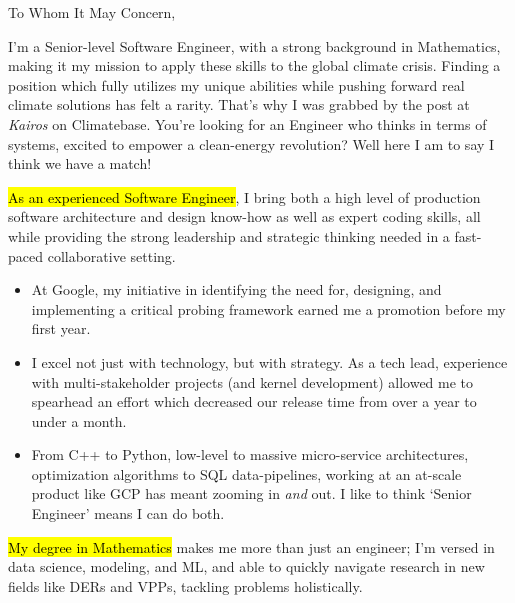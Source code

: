 \documentclass{tc_cv}
\begin{document}

\begin{adjustwidth}{40pt}{40pt}
  \large

  To Whom It May Concern, \par \bigbreak

  I'm a Senior-level Software Engineer, with a strong background in
  Mathematics, making it my mission to apply these skills to the global climate
  crisis. Finding a position which fully utilizes my unique abilities while
  pushing forward real climate solutions has felt a rarity. That's why I was
  grabbed by the post at \emph{Kairos} on Climatebase. You're looking for an
  Engineer who thinks in terms of systems, excited to empower a clean-energy
  revolution? Well here I am to say I think we have a match! \medbreak

  \hl{As an experienced Software Engineer}, I bring both a high level of
  production software architecture and design know-how as well as expert coding
  skills, all while providing the strong leadership and strategic thinking
  needed in a fast-paced collaborative setting.
  \begin{itemize}

    \item At Google, my initiative in identifying the need for, designing, and
      implementing a critical probing framework earned me a promotion before my
      first year. %

    \item I excel not just with technology, but with strategy. As a tech lead,
      experience with multi-stakeholder projects (and kernel development)
      allowed me to spearhead an effort which decreased our release time from
      over a year to under a month.

    \item From C++ to Python, low-level to massive micro-service architectures,
      optimization algorithms to SQL data-pipelines, working at an at-scale
      product like GCP has meant zooming in \emph{and} out. I like to think
      `Senior Engineer' means I can do both.

  \end{itemize} \medskip

  \hl{My degree in Mathematics} makes me more than just an engineer; I'm versed
  in data science, modeling, and ML, and able to quickly navigate research in
  new fields like DERs and VPPs, tackling problems holistically.


\end{adjustwidth}
\end{document}
